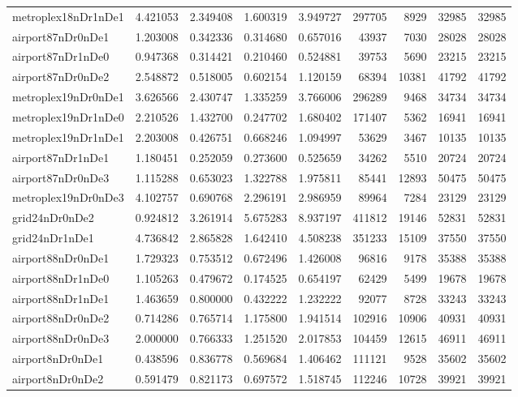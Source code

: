 \begin{longtable}{|l|r|r|r|r|r|r|r|r|}
metroplex18nDr1nDe1 & 4.421053 & 2.349408 & 1.600319 & 3.949727 & 297705 & 8929 & 32985 & 32985 \\
airport87nDr0nDe1 & 1.203008 & 0.342336 & 0.314680 & 0.657016 & 43937 & 7030 & 28028 & 28028 \\
airport87nDr1nDe0 & 0.947368 & 0.314421 & 0.210460 & 0.524881 & 39753 & 5690 & 23215 & 23215 \\
airport87nDr0nDe2 & 2.548872 & 0.518005 & 0.602154 & 1.120159 & 68394 & 10381 & 41792 & 41792 \\
metroplex19nDr0nDe1 & 3.626566 & 2.430747 & 1.335259 & 3.766006 & 296289 & 9468 & 34734 & 34734 \\
metroplex19nDr1nDe0 & 2.210526 & 1.432700 & 0.247702 & 1.680402 & 171407 & 5362 & 16941 & 16941 \\
metroplex19nDr1nDe1 & 2.203008 & 0.426751 & 0.668246 & 1.094997 & 53629 & 3467 & 10135 & 10135 \\
airport87nDr1nDe1 & 1.180451 & 0.252059 & 0.273600 & 0.525659 & 34262 & 5510 & 20724 & 20724 \\
airport87nDr0nDe3 & 1.115288 & 0.653023 & 1.322788 & 1.975811 & 85441 & 12893 & 50475 & 50475 \\
metroplex19nDr0nDe3 & 4.102757 & 0.690768 & 2.296191 & 2.986959 & 89964 & 7284 & 23129 & 23129 \\
grid24nDr0nDe2 & 0.924812 & 3.261914 & 5.675283 & 8.937197 & 411812 & 19146 & 52831 & 52831 \\
grid24nDr1nDe1 & 4.736842 & 2.865828 & 1.642410 & 4.508238 & 351233 & 15109 & 37550 & 37550 \\
airport88nDr0nDe1 & 1.729323 & 0.753512 & 0.672496 & 1.426008 & 96816 & 9178 & 35388 & 35388 \\
airport88nDr1nDe0 & 1.105263 & 0.479672 & 0.174525 & 0.654197 & 62429 & 5499 & 19678 & 19678 \\
airport88nDr1nDe1 & 1.463659 & 0.800000 & 0.432222 & 1.232222 & 92077 & 8728 & 33243 & 33243 \\
airport88nDr0nDe2 & 0.714286 & 0.765714 & 1.175800 & 1.941514 & 102916 & 10906 & 40931 & 40931 \\
airport88nDr0nDe3 & 2.000000 & 0.766333 & 1.251520 & 2.017853 & 104459 & 12615 & 46911 & 46911 \\
airport8nDr0nDe1 & 0.438596 & 0.836778 & 0.569684 & 1.406462 & 111121 & 9528 & 35602 & 35602 \\
airport8nDr0nDe2 & 0.591479 & 0.821173 & 0.697572 & 1.518745 & 112246 & 10728 & 39921 & 39921 \\

\end{longtable}
